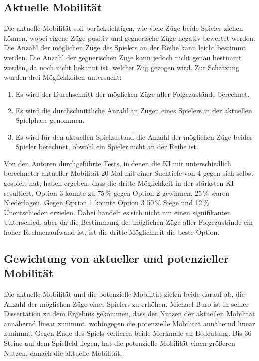 \subsection{Aktuelle Mobilität}
\label{sec:currentmobility}
Die aktuelle Mobilität soll berücksichtigen, wie viele Züge beide Spieler ziehen können, wobei eigene Züge positiv und
gegnerische Züge negativ bewertet werden. Die Anzahl der möglichen Züge des Spielers an der Reihe kann leicht bestimmt
werden. Die Anzahl der gegnerischen Züge kann jedoch nicht genau bestimmt werden, da noch nicht bekannt ist, welcher Zug
gezogen wird. Zur Schätzung wurden drei Möglichkeiten untersucht:
\begin{enumerate}
    \item Es wird der Durchschnitt der möglichen Züge aller Folgezustände berechnet.
    \item Es wird die durchschnittliche Anzahl an Zügen eines Spielers in der aktuellen Spielphase genommen.
    \item Es wird für den aktuellen Spielzustand die Anzahl der möglichen Züge beider Spieler berechnet, obwohl ein
    Spieler nicht an der Reihe ist.
\end{enumerate}
Von den Autoren durchgeführte Tests, in denen die KI mit unterschiedlich berechneter aktueller Mobilität 20 Mal mit
einer Suchtiefe von 4 gegen sich selbst gespielt hat, haben ergeben, dass die dritte Möglichkeit in der stärksten KI
resultiert. Option 3 konnte zu 75\,\% gegen Option 2 gewinnen, 25\,\% waren Niederlagen. Gegen Option 1 konnte Option 3
50\,\% Siege und 12\,\% Unentschieden erzielen. Dabei handelt es sich nicht um einen signifikanten Unterschied, aber da
die Bestimmung der möglichen Züge aller Folgezustände ein hoher Rechnenaufwand ist, ist die dritte Möglichkeit die beste
Option.

\subsection{Gewichtung von aktueller und potenzieller Mobilität}
\label{sec:combinedmobility}
Die aktuelle Mobilität und die potenzielle Mobilität zielen beide darauf ab, die Anzahl der möglichen Züge eines
Spielers zu erhöhen. Michael Buro ist in seiner Dissertation zu dem Ergebnis gekommen, dass der Nutzen der aktuellen
Mobilität annähernd linear zunimmt, wohingegen die potenzielle Mobilität annähernd linear zunimmt. Gegen Ende des Spiels
verlieren beide Merkmale an Bedeutung. Bis 36 Steine auf dem Spielfeld liegen, hat die potenzielle Mobilität einen
größeren Nutzen, danach die aktuelle Mobilität. \cite[S.~20]{evaluationfunctions}

